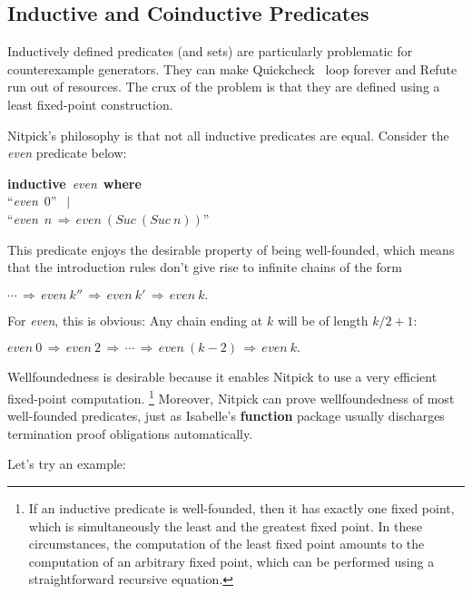 \documentclass[a4paper,12pt]{article}
\renewcommand\_{\hbox{\textunderscore\kern-.05ex}}
\begin{document}
\subsection{Inductive and Coinductive Predicates}
\label{inductive-and-coinductive-predicates}

Inductively defined predicates (and sets) are particularly problematic for
counterexample generators. They can make Quickcheck~\cite{berghofer-nipkow-2004}
loop forever and Refute~\cite{weber-2008} run out of resources. The crux of
the problem is that they are defined using a least fixed-point construction.

Nitpick's philosophy is that not all inductive predicates are equal. Consider
the \textit{even} predicate below:

\prew
\textbf{inductive}~\textit{even}~\textbf{where} \\
``\textit{even}~0'' $\,\mid$ \\
``\textit{even}~$n\,\Longrightarrow\, \textit{even}~(\textit{Suc}~(\textit{Suc}~n))$''
\postw

This predicate enjoys the desirable property of being well-founded, which means
that the introduction rules don't give rise to infinite chains of the form

\prew
$\cdots\,\Longrightarrow\, \textit{even}~k''
       \,\Longrightarrow\, \textit{even}~k'
       \,\Longrightarrow\, \textit{even}~k.$
\postw

For \textit{even}, this is obvious: Any chain ending at $k$ will be of length
$k/2 + 1$:

\prew
$\textit{even}~0\,\Longrightarrow\, \textit{even}~2\,\Longrightarrow\, \cdots
       \,\Longrightarrow\, \textit{even}~(k - 2)
       \,\Longrightarrow\, \textit{even}~k.$
\postw

Wellfoundedness is desirable because it enables Nitpick to use a very efficient
fixed-point computation.%
\footnote{If an inductive predicate is
well-founded, then it has exactly one fixed point, which is simultaneously the
least and the greatest fixed point. In these circumstances, the computation of
the least fixed point amounts to the computation of an arbitrary fixed point,
which can be performed using a straightforward recursive equation.}
Moreover, Nitpick can prove wellfoundedness of most well-founded predicates,
just as Isabelle's \textbf{function} package usually discharges termination
proof obligations automatically.

Let's try an example:
\end{document}

